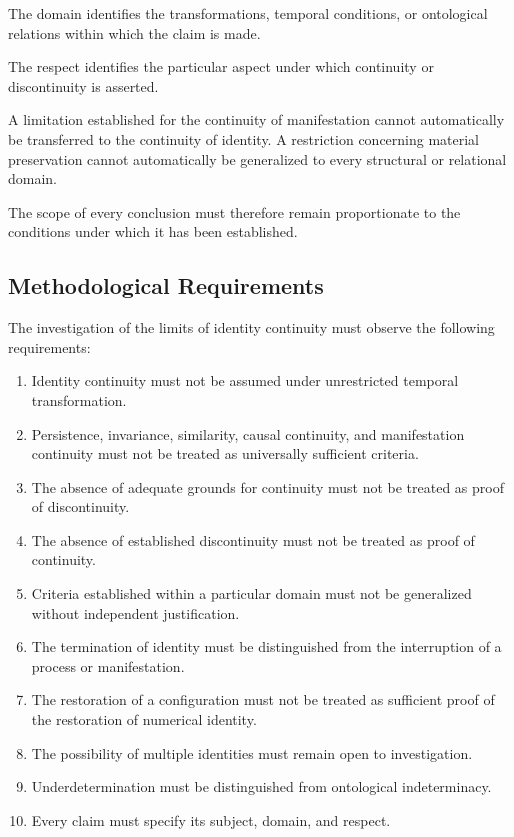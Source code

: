 The domain identifies the transformations, temporal
conditions, or ontological relations within which
the claim is made.

The respect identifies the particular aspect
under which continuity or discontinuity is asserted.

A limitation established for the continuity
of manifestation cannot automatically be transferred
to the continuity of identity. A restriction
concerning material preservation cannot automatically
be generalized to every structural or relational
domain.

The scope of every conclusion must therefore
remain proportionate to the conditions under
which it has been established.

\subsection{Methodological Requirements}

The investigation of the limits of identity
continuity must observe the following requirements:

\begin{enumerate}
    \item Identity continuity must not be assumed
    under unrestricted temporal transformation.
    \item Persistence, invariance, similarity,
    causal continuity, and manifestation continuity
    must not be treated as universally sufficient
    criteria.
    \item The absence of adequate grounds for
    continuity must not be treated as proof
    of discontinuity.
    \item The absence of established discontinuity
    must not be treated as proof of continuity.
    \item Criteria established within a particular
    domain must not be generalized without
    independent justification.
    \item The termination of identity must be
    distinguished from the interruption of
    a process or manifestation.
    \item The restoration of a configuration
    must not be treated as sufficient proof
    of the restoration of numerical identity.
    \item The possibility of multiple identities
    must remain open to investigation.
    \item Underdetermination must be distinguished
    from ontological indeterminacy.
    \item Every claim must specify its subject,
    domain, and respect.
\end{enumerate}

